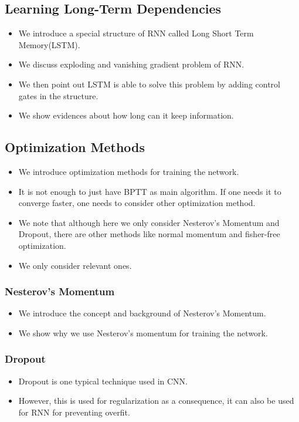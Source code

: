 \documentclass[officiallayout]{tktla}
\begin{document}
\subsection{Learning Long-Term Dependencies}

\begin{itemize}
\item We introduce a special structure of RNN called Long Short Term Memory(LSTM).
\item We discuss exploding and vanishing gradient problem of RNN.
\item We then point out LSTM is able to solve this problem by adding control gates in the structure.
\item We show evidences about how long can it keep information.
\end{itemize}

\subsection{Optimization Methods}
\begin{itemize}
\item We introduce optimization methods for training the network.
\item It is not enough to just have BPTT as main algorithm. If one needs it to converge faster, one needs to consider other optimization method.
\item We note that although here we only consider Nesterov's Momentum and Dropout, there are other methods like normal momentum and fisher-free optimization.
\item We only consider relevant ones.
\end{itemize}
\subsubsection{Nesterov's Momentum}
\begin{itemize}
\item We introduce the concept and background of Nesterov's Momentum.
\item We show why we use Nesterov's momentum for training the network.
\end{itemize}


\subsubsection{Dropout}
\begin{itemize}
\item Dropout is one typical technique used in CNN.
\item However, this is used for regularization as a consequence, it can also be used for RNN for preventing overfit. 
\end{itemize}
\end{document}
